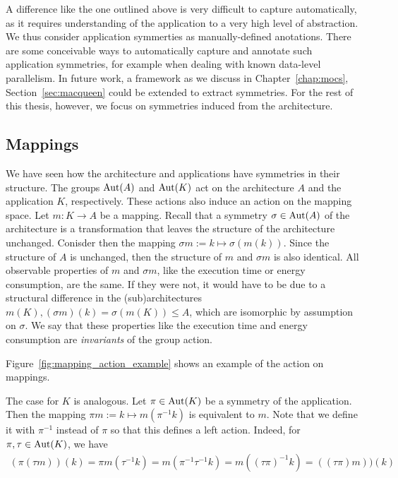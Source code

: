 A difference like the one outlined above is very difficult to capture automatically, as it requires understanding of the application to a very high level of abstraction.
We thus consider application symmerties as manually-defined anotations.
There are some conceivable ways to automatically capture and annotate such application symmetries, for example when dealing with known data-level parallelism.
In future work, a framework as we discuss in Chapter~\ref{chap:mocs}, Section~\ref{sec:macqueen} could be extended to extract symmetries.
For the rest of this thesis, however, we focus on symmetries induced from the architecture.

\subsection{Mappings}

We have seen how the architecture and applications have symmetries in their structure. 
The groups $\operatorname{Aut}(A)$ and $\operatorname{Aut}(K)$ act on the architecture $A$ and the application $K$, respectively.
These actions also induce an action on the mapping space. 
Let $m : K \rightarrow A$ be a mapping.
Recall that a symmetry $\sigma \in \operatorname{Aut}(A)$ of the architecture is a transformation that leaves the structure of the architecture unchanged.
Conisder then the mapping $\sigma m := k \mapsto \sigma(m(k))$.
Since the structure of $A$ is unchanged, then the structure of $m$ and $\sigma m$ is also identical.
All observable properties of $m$ and $\sigma m$, like the execution time or energy consumption, are the same.
If they were not, it would have to be due to a structural difference in the (sub)architectures $m(K),(\sigma m)(k) = \sigma(m(K)) \leq A$, which are isomorphic by assumption on $\sigma$.
We say that these properties like the execution time and energy consumption are \emph{invariants} of the group action.

Figure~\ref{fig:mapping_action_example} shows an example of the action on mappings. 

The case for $K$ is analogous.
Let $\pi \in \operatorname{Aut}(K)$ be a symmetry of the application.
Then the mapping $\pi m := k \mapsto m(\pi^{-1}k)$ is equivalent to $m$.
Note that we define it with $\pi^{-1}$ instead of $\pi$ so that this defines a left action.
Indeed, for $\pi, \tau \in \operatorname{Aut}(K)$, we have
\begin{align*}
  (\pi (\tau m))(k) = \pi m(\tau^{-1}k) = m(\pi^{-1}\tau^{-1}k) = m((\tau \pi)^{-1}k) = ((\tau \pi) m))(k) 
\end{align*}

